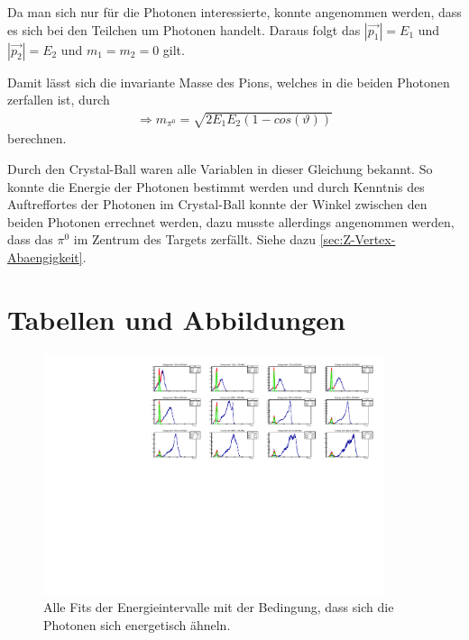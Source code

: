 \documentclass[a4paper,11pt,oneside,final,german,openbib,pdftex]{scrbook}
\begin{document}
{\begin{appendix}
Da man sich nur f\"ur die Photonen interessierte, konnte angenommen werden, dass es sich bei den Teilchen um Photonen handelt. Daraus folgt das $|\overrightarrow{p_1}|=E_1$ und $|\overrightarrow{p_2}|=E_2$ und $m_1=m_2=0$ gilt.

Damit lässt sich die invariante Masse des Pions, welches in die beiden Photonen zerfallen ist, durch
\begin{equation}
\begin{split}
\Rightarrow{m_{\pi^0}=\sqrt{2E_1E_2(1-cos(\vartheta))}}
\label{eq:Formel-zur-Berechnung-der-Invariante-Masse-Herleitung}
\end{split}
\end{equation}
berechnen.

Durch den Crystal-Ball waren alle Variablen in dieser Gleichung bekannt. So konnte die Energie der Photonen bestimmt werden und durch Kenntnis des Auftreffortes der Photonen im Crystal-Ball konnte der Winkel zwischen den beiden Photonen errechnet werden, dazu musste allerdings angenommen werden, dass das $\pi^0$ im Zentrum des Targets zerfällt. Siehe dazu \ref{sec:Z-Vertex-Abaengigkeit}.

\section{Tabellen und Abbildungen}


\begin{figure}[h!]
	\begin{center}
		\includegraphics[width=100mm]{RealDataEnergyIntervalSymmetricPhotonsAllFits}
		\caption{Alle Fits der Energieintervalle mit der Bedingung, dass sich die Photonen sich energetisch ähneln.}
		\label{fig:similarenergyallfits}
	\end{center}
\end{figure}





\end{appendix}}
\end{document}
